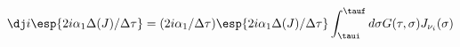 \begin{equation}
\dj i\esp{ 2i\alpha_1\Delta(J)/\Delta\tau}=(2i\alpha_1/\Delta\tau)\esp{ 
2i\alpha_1\Delta(J)/\Delta\tau}
\int_{\taui}^{\tauf}d\sigma G(\tau,\sigma) J_{\nu_i}(\sigma)
\end{equation}

